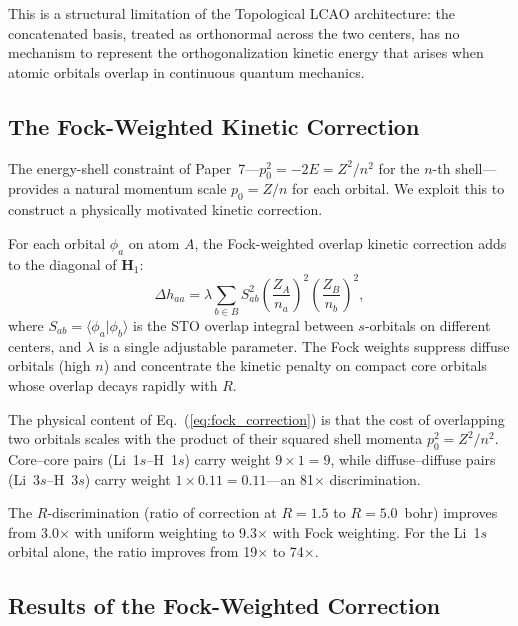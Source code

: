 \documentclass[aps,pra,twocolumn,superscriptaddress,longbibliography]{revtex4-2}
\begin{document}
This is a structural limitation of the Topological LCAO architecture:
the concatenated basis, treated as orthonormal across the two centers,
has no mechanism to represent the orthogonalization kinetic energy that
arises when atomic orbitals overlap in continuous quantum mechanics.

\subsection{The Fock-Weighted Kinetic Correction}
\label{sec:fock_correction}

The energy-shell constraint of Paper~7---$p_0^2 = -2E = Z^2/n^2$ for
the $n$-th shell---provides a natural momentum scale $p_0 = Z/n$ for
each orbital.  We exploit this to construct a physically motivated
kinetic correction.

For each orbital $\phi_a$ on atom $A$, the Fock-weighted overlap
kinetic correction adds to the diagonal of $\mathbf{H}_1$:
\begin{equation}
\Delta h_{aa} = \lambda \sum_{b \in B}
S_{ab}^2 \left(\frac{Z_A}{n_a}\right)^2
\left(\frac{Z_B}{n_b}\right)^2,
\label{eq:fock_correction}
\end{equation}
where $S_{ab} = \langle \phi_a | \phi_b \rangle$ is the STO overlap
integral between $s$-orbitals on different centers, and $\lambda$ is a
single adjustable parameter.  The Fock weights suppress diffuse
orbitals (high $n$) and concentrate the kinetic penalty on compact core
orbitals whose overlap decays rapidly with $R$.

The physical content of Eq.~(\ref{eq:fock_correction}) is that the cost
of overlapping two orbitals scales with the product of their squared
shell momenta $p_0^2 = Z^2/n^2$.  Core--core
pairs (Li~1$s$--H~1$s$) carry weight $9 \times 1 = 9$, while
diffuse--diffuse pairs (Li~3$s$--H~3$s$) carry weight
$1 \times 0.11 = 0.11$---an 81$\times$ discrimination.

The $R$-discrimination (ratio of correction at $R=1.5$ to $R=5.0$~bohr)
improves from 3.0$\times$ with uniform weighting to 9.3$\times$ with
Fock weighting.  For the Li~1$s$ orbital alone, the ratio improves from
19$\times$ to 74$\times$.

\subsection{Results of the Fock-Weighted Correction}
\label{sec:fock_results}
\end{document}
